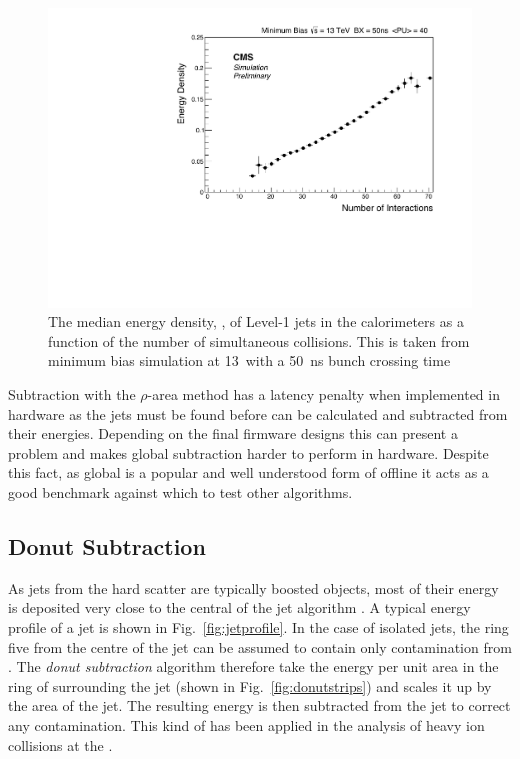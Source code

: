 \begin{figure}
	\begin{center}
		\includegraphics[width=0.8\linewidth]{figs/trigger/median}
  \caption{The median energy density, \rho, of Level-1 jets in the \CMS
  calorimeters as a function of the number of simultaneous collisions.
  This is taken from minimum bias \MC simulation at 13~\tev with a
  50~ns bunch crossing time}
	\label{fig:rho}
	\end{center}
\end{figure}

Subtraction with the $\rho$-area method has a latency penalty when
implemented in hardware as the jets must be found before \rho can be
calculated and subtracted from their energies. Depending on the final
firmware designs this can present a problem and makes global \rho
subtraction harder to perform in hardware. Despite this fact, as
global \rho is a popular and well understood form of offline \PUS it
acts as a good benchmark against which to test other algorithms.

\subsection{Donut Subtraction}

As jets from the hard scatter are typically boosted objects, most of
their energy is deposited very close to the central \TT of the jet
algorithm \cite{JetProfile_pileup}. A typical energy profile of a jet
is shown in Fig.~\ref{fig:jetprofile}. In the case of isolated jets,
the ring five \TTs from the centre of the jet can be assumed to contain
only contamination from \PU.  The \emph{donut subtraction} algorithm therefore take the
energy per unit area in the ring of \TTs surrounding the jet (shown in
Fig.~\ref{fig:donutstrips}) and scales
it up by the area of the jet. The resulting energy is then subtracted
from the jet to correct any \PU contamination. This kind of \PUS has
been applied in the analysis of heavy ion collisions at the \LHC
\cite{Cacciari:2010te}.


